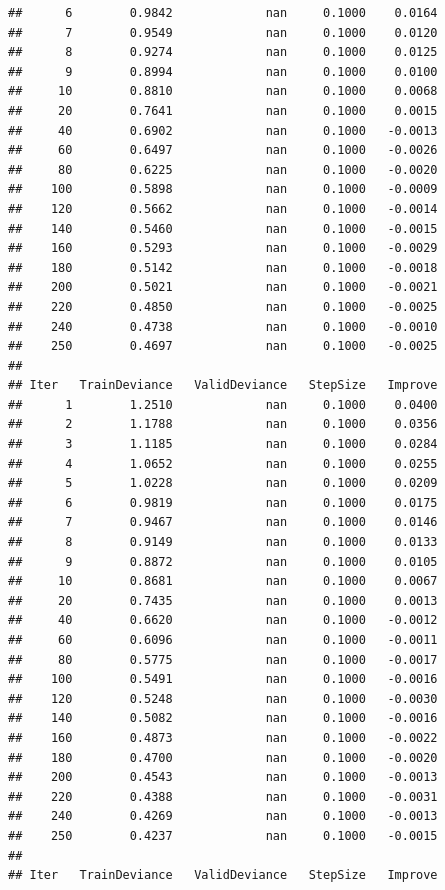 \documentclass[]{book}
\begin{document}
\begin{verbatim}
##      6        0.9842             nan     0.1000    0.0164
##      7        0.9549             nan     0.1000    0.0120
##      8        0.9274             nan     0.1000    0.0125
##      9        0.8994             nan     0.1000    0.0100
##     10        0.8810             nan     0.1000    0.0068
##     20        0.7641             nan     0.1000    0.0015
##     40        0.6902             nan     0.1000   -0.0013
##     60        0.6497             nan     0.1000   -0.0026
##     80        0.6225             nan     0.1000   -0.0020
##    100        0.5898             nan     0.1000   -0.0009
##    120        0.5662             nan     0.1000   -0.0014
##    140        0.5460             nan     0.1000   -0.0015
##    160        0.5293             nan     0.1000   -0.0029
##    180        0.5142             nan     0.1000   -0.0018
##    200        0.5021             nan     0.1000   -0.0021
##    220        0.4850             nan     0.1000   -0.0025
##    240        0.4738             nan     0.1000   -0.0010
##    250        0.4697             nan     0.1000   -0.0025
## 
## Iter   TrainDeviance   ValidDeviance   StepSize   Improve
##      1        1.2510             nan     0.1000    0.0400
##      2        1.1788             nan     0.1000    0.0356
##      3        1.1185             nan     0.1000    0.0284
##      4        1.0652             nan     0.1000    0.0255
##      5        1.0228             nan     0.1000    0.0209
##      6        0.9819             nan     0.1000    0.0175
##      7        0.9467             nan     0.1000    0.0146
##      8        0.9149             nan     0.1000    0.0133
##      9        0.8872             nan     0.1000    0.0105
##     10        0.8681             nan     0.1000    0.0067
##     20        0.7435             nan     0.1000    0.0013
##     40        0.6620             nan     0.1000   -0.0012
##     60        0.6096             nan     0.1000   -0.0011
##     80        0.5775             nan     0.1000   -0.0017
##    100        0.5491             nan     0.1000   -0.0016
##    120        0.5248             nan     0.1000   -0.0030
##    140        0.5082             nan     0.1000   -0.0016
##    160        0.4873             nan     0.1000   -0.0022
##    180        0.4700             nan     0.1000   -0.0020
##    200        0.4543             nan     0.1000   -0.0013
##    220        0.4388             nan     0.1000   -0.0031
##    240        0.4269             nan     0.1000   -0.0013
##    250        0.4237             nan     0.1000   -0.0015
## 
## Iter   TrainDeviance   ValidDeviance   StepSize   Improve

\end{verbatim}
\end{document}

